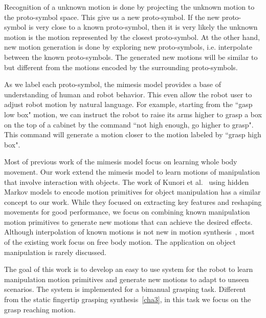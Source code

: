 Recognition of a unknown motion is done by projecting the unknown motion to the proto-symbol space. This give us a new proto-symbol. If the new proto-symbol is very close to a known proto-symbol, then it is very likely the unknown motion is the motion represented by the closest proto-symbol. At the other hand, new motion generation is done by exploring new proto-symbols, i.e. interpolate between the known proto-symbols. The generated new motions will be similar to but different from the motions encoded by the surrounding proto-symbols.

As we label each proto-symbol, the mimesis model provides a base of understanding of human and robot behavior. This even allow the robot user to adjust robot motion by natural language. For example, starting from the ``gasp low box" motion, we can instruct the robot to raise its arms higher to grasp a box on the top of a cabinet by the command ``not high enough, go higher to grasp". This command will generate a motion closer to the motion labeled by ``grasp high box".

Most of previous work of the mimesis model focus on learning whole body movement. Our work extend the mimesis model to learn motions of manipulation that involve interaction with objects.
The work of Kunori et al.~\citep{kunori2009associating} using hidden Markov models to encode motion primitives for object manipulation has a similar concept to our work. While they focused on extracting key features and reshaping movements for good performance, we focus on combining known manipulation motion primitives to generate new motions that can achieve the desired effects. Although interpolation of known motions is not new in motion synthesis~\citep{hoshino2004interpolation,glardon2004pca}, most of the existing work focus on free body motion. The application on object manipulation is rarely discussed.

The goal of this work is to develop an easy to use system for the robot to learn manipulation motion primitives and generate new motions to adapt to unseen scenarios. The system is implemented for a bimanual grasping task. Different from the static fingertip grasping synthesis~\ref{cha3}, in this task we focus on the grasp reaching motion.



 
